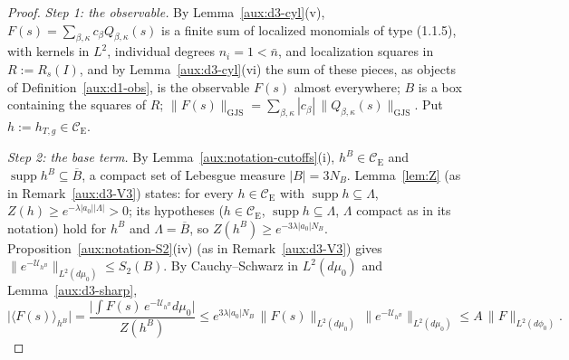 \documentclass[11pt,a4paper]{article}
\theoremstyle{plain}
\theoremstyle{definition}
\theoremstyle{plain}
\theoremstyle{definition}
\newcommand{\CE}{\mathcal{C}_{\mathrm E}}
\DeclareMathOperator{\supp}{supp}
\newcommand{\GJS}[1]{\lVert #1\rVert_{\mathrm{GJS}}}   %
\newcommand{\ev}[2]{\langle #1\rangle_{#2}}            %
\newcommand{\Uc}{\mathcal U}
\newcommand{\dmu}{d\mu_0}
\newcommand{\dphi}{d\phi_0}
\begin{document}
\begin{proof}
\emph{Step 1: the observable.}  By Lemma~\ref{aux:d3-cyl}(v), $F(s)=\sum_{\beta,\kappa}c_\beta
Q_{\beta,\kappa}(s)$ is a finite sum of localized monomials of type (1.1.5), with kernels in $L^2$,
individual degrees $n_i=1<\bar n$, and localization squares in $R:=R_s(I)$, and by
Lemma~\ref{aux:d3-cyl}(vi) the sum of these pieces, as objects of Definition~\ref{aux:d1-obs}, is
the observable $F(s)$ almost everywhere; $B$ is a box containing the squares of $R$;
$\GJS{F(s)}=\sum_{\beta,\kappa}|c_\beta|\,\GJS{Q_{\beta,\kappa}(s)}$.  Put $h:=h_{T,g}\in\CE$.

\emph{Step 2: the base term.}  By Lemma~\ref{aux:notation-cutoffs}(i), $h^B\in\CE$ and
$\supp h^B\subseteq\overline B$, a compact set of Lebesgue measure $|B|=3N_B$.  Lemma~\ref{lem:Z} (as in Remark~\ref{aux:d3-V3}) states: for every $h\in\CE$ with
$\supp h\subseteq\Lambda$, $Z(h)\ge e^{-\lambda|a_0||\Lambda|}>0$; its hypotheses ($h\in\CE$,
$\supp h\subseteq\Lambda$, $\Lambda$ compact as in its notation) hold for $h^B$ and
$\Lambda=\overline B$, so $Z(h^B)\ge e^{-3\lambda|a_0|N_B}$.
Proposition~\ref{aux:notation-S2}(iv) (as in Remark~\ref{aux:d3-V3}) gives
$\|e^{-\Uc_{h^B}}\|_{L^2(\dmu)}\le S_2(B)$.  By Cauchy--Schwarz in $L^2(\dmu)$ and Lemma~\ref{aux:d3-sharp},
\[
 \bigl|\ev{F(s)}{h^B}\bigr|=\frac{\bigl|\int F(s)\,e^{-\Uc_{h^B}}\dmu\bigr|}{Z(h^B)}
 \le e^{3\lambda|a_0|N_B}\,\|F(s)\|_{L^2(\dmu)}\,\|e^{-\Uc_{h^B}}\|_{L^2(\dmu)}
 \le A\,\|F\|_{L^2(\dphi)} .
\]


\end{proof}
\end{document}

